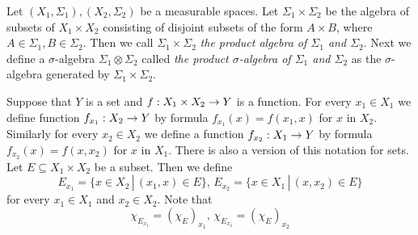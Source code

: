 \begin{definition}
Let $(X_1,\Sigma_1), (X_2,\Sigma_2)$ be a measurable spaces. Let $\Sigma_1\times \Sigma_2$ be the algebra of subsets of $X_1\times X_2$ consisting of disjoint subsets of the form $A\times B$, where $A\in \Sigma_1,B\in \Sigma_2$. Then we call $\Sigma_1\times \Sigma_2$ \textit{the product algebra of $\Sigma_1$ and $\Sigma_2$}. Next we define a $\sigma$-algebra $\Sigma_1\otimes \Sigma_2$ called \textit{the product $\sigma$-algebra of $\Sigma_1$ and $\Sigma_2$} as the $\sigma$-algebra generated by $\Sigma_1\times \Sigma_2$.
\end{definition}
\noindent
Suppose that $Y$ is a set and $f:X_1\times X_2\rightarrow Y$ is a function. For every $x_1\in X_1$ we define function $f_{x_1}:X_2\rightarrow Y$ by formula $f_{x_1}(x) = f(x_1,x)$ for $x$ in $X_2$. Similarly for every $x_2\in X_2$ we define a function $f_{x_2}:X_1\rightarrow Y$ by formula $f_{x_2}(x) = f(x,x_2)$ for $x$ in $X_1$. There is also a version of this notation for sets. Let $E\subseteq X_1\times X_2$ be a subset. Then we define
$$E_{x_1} = \{x\in X_2\,|\,(x_1,x)\in E\},\,E_{x_2} = \{x\in X_1\,|\,(x,x_2)\in E\}$$
for every $x_1\in X_1$ and $x_2\in X_2$. Note that
$$\chi_{E_{x_1}} = \left(\chi_E\right)_{x_1},\,\chi_{E_{x_2}} = \left(\chi_E\right)_{x_2}$$

